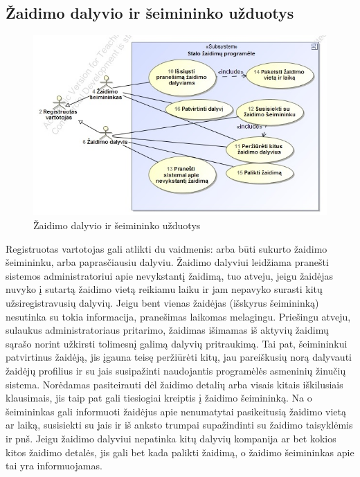 \documentclass{VUMIFPSkursinis}
\begin{document}
	\subsection{Žaidimo dalyvio ir šeimininko užduotys}
		\begin{figure}[H]
			\centering
			\includegraphics[scale=0.5]{img/UzduociuDiagrama2}
			\caption{Žaidimo dalyvio ir šeimininko užduotys}
			\label{img:UzduociuDiagrama2}
		\end{figure}
		Registruotas vartotojas gali atlikti du vaidmenis: arba būti sukurto žaidimo šeimininku, arba paprasčiausiu dalyviu. Žaidimo dalyviui leidžiama pranešti sistemos administratoriui apie nevykstantį žaidimą, tuo atveju, jeigu žaidėjas nuvyko į sutartą žaidimo vietą reikiamu laiku ir jam nepavyko surasti kitų užsiregistravusių dalyvių. Jeigu bent vienas žaidėjas (išskyrus šeimininką) nesutinka su tokia informacija, pranešimas laikomas melagingu. Priešingu atveju, sulaukus administratoriaus pritarimo, žaidimas išimamas iš aktyvių žaidimų sąrašo norint užkirsti tolimesnį galimą dalyvių pritraukimą. Tai pat, šeimininkui patvirtinus žaidėją, jis įgauna teisę peržiūrėti kitų, jau pareiškusių norą dalyvauti žaidėjų profilius ir su jais susipažinti naudojantis programėlės asmeninių žinučių sistema. Norėdamas pasiteirauti dėl žaidimo detalių arba visais kitais iškilusiais klausimais, jis taip pat gali tiesiogiai kreiptis į žaidimo šeimininką. Na o šeimininkas gali informuoti žaidėjus apie nenumatytai pasikeitusią žaidimo vietą ar laiką, susisiekti su jais ir iš anksto trumpai supažindinti su žaidimo taisyklėmis ir pnš. Jeigu žaidimo dalyviui nepatinka kitų dalyvių kompanija ar bet kokios kitos žaidimo detalės, jis gali bet kada palikti žaidimą, o žaidimo šeimininkas apie tai yra informuojamas.
\end{document}
